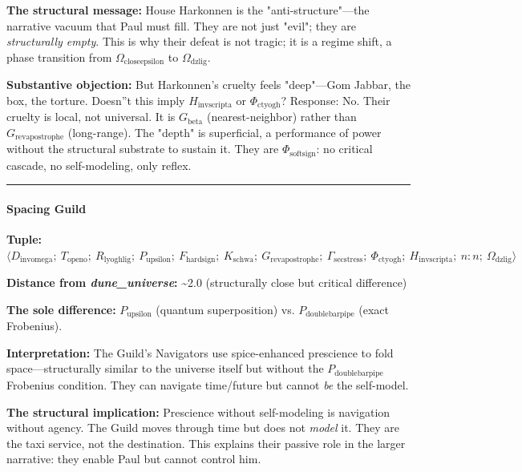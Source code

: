 \documentclass[12pt,a4paper]{article}
\begin{document}
\textbf{The structural message:} House Harkonnen is the "anti-structure"---the narrative vacuum that Paul must fill. They are not just "evil"; they are \emph{structurally empty}. This is why their defeat is not tragic; it is a regime shift, a phase transition from $\Omega_{\text{closeepsilon}}$ to $\Omega_{\text{dzlig}}$.

\textbf{Substantive objection:} But Harkonnen's cruelty feels "deep"---Gom Jabbar, the box, the torture. Doesn''t this imply $H_{\text{invscripta}}$ or $\Phi_{\text{ctyogh}}$? Response: No. Their cruelty is local, not universal. It is $G_{\text{beta}}$ (nearest-neighbor) rather than $G_{\text{revapostrophe}}$ (long-range). The "depth" is superficial, a performance of power without the structural substrate to sustain it. They are $\Phi_{\text{softsign}}$: no critical cascade, no self-modeling, only reflex.

\begin{center}
\rule{0.5\textwidth}{0.4pt}
\end{center}

\paragraph{Spacing Guild}

\textbf{Tuple:} $\langle D_{\text{invomega}};\ T_{\text{openo}};\ R_{\text{lyoghlig}};\ P_{\text{upsilon}};\ F_{\text{hardsign}};\ K_{\text{schwa}};\ G_{\text{revapostrophe}};\ \Gamma_{\text{secstress}};\ \Phi_{\text{ctyogh}};\ H_{\text{invscripta}};\ n{:}n;\ \Omega_{\text{dzlig}} \rangle$

\textbf{Distance from \emph{dune\_universe}:} \textasciitilde{}2.0 (structurally close but critical difference)

\textbf{The sole difference:} $P_{\text{upsilon}}$ (quantum superposition) vs. $P_{\text{doublebarpipe}}$ (exact Frobenius).

\textbf{Interpretation:} The Guild's Navigators use spice-enhanced prescience to fold space---structurally similar to the universe itself but without the $P_{\text{doublebarpipe}}$ Frobenius condition. They can navigate time/future but cannot \emph{be} the self-model.

\textbf{The structural implication:} Prescience without self-modeling is navigation without agency. The Guild moves through time but does not \emph{model} it. They are the taxi service, not the destination. This explains their passive role in the larger narrative: they enable Paul but cannot control him.
\end{document}
